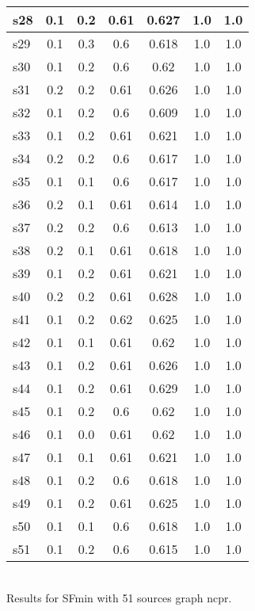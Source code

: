 \documentclass{article}
\begin{document}
\begin{tabular}{|l|c|c|c|c|c|c|}
\hline
s28 &0.1 & 0.2 & 0.61 & 0.627 & 1.0 & 1.0\\
\hline
s29 &0.1 & 0.3 & 0.6 & 0.618 & 1.0 & 1.0\\
\hline
s30 &0.1 & 0.2 & 0.6 & 0.62 & 1.0 & 1.0\\
\hline
s31 &0.2 & 0.2 & 0.61 & 0.626 & 1.0 & 1.0\\
\hline
s32 &0.1 & 0.2 & 0.6 & 0.609 & 1.0 & 1.0\\
\hline
s33 &0.1 & 0.2 & 0.61 & 0.621 & 1.0 & 1.0\\
\hline
s34 &0.2 & 0.2 & 0.6 & 0.617 & 1.0 & 1.0\\
\hline
s35 &0.1 & 0.1 & 0.6 & 0.617 & 1.0 & 1.0\\
\hline
s36 &0.2 & 0.1 & 0.61 & 0.614 & 1.0 & 1.0\\
\hline
s37 &0.2 & 0.2 & 0.6 & 0.613 & 1.0 & 1.0\\
\hline
s38 &0.2 & 0.1 & 0.61 & 0.618 & 1.0 & 1.0\\
\hline
s39 &0.1 & 0.2 & 0.61 & 0.621 & 1.0 & 1.0\\
\hline
s40 &0.2 & 0.2 & 0.61 & 0.628 & 1.0 & 1.0\\
\hline
s41 &0.1 & 0.2 & 0.62 & 0.625 & 1.0 & 1.0\\
\hline
s42 &0.1 & 0.1 & 0.61 & 0.62 & 1.0 & 1.0\\
\hline
s43 &0.1 & 0.2 & 0.61 & 0.626 & 1.0 & 1.0\\
\hline
s44 &0.1 & 0.2 & 0.61 & 0.629 & 1.0 & 1.0\\
\hline
s45 &0.1 & 0.2 & 0.6 & 0.62 & 1.0 & 1.0\\
\hline
s46 &0.1 & 0.0 & 0.61 & 0.62 & 1.0 & 1.0\\
\hline
s47 &0.1 & 0.1 & 0.61 & 0.621 & 1.0 & 1.0\\
\hline
s48 &0.1 & 0.2 & 0.6 & 0.618 & 1.0 & 1.0\\
\hline
s49 &0.1 & 0.2 & 0.61 & 0.625 & 1.0 & 1.0\\
\hline
s50 &0.1 & 0.1 & 0.6 & 0.618 & 1.0 & 1.0\\
\hline
s51 &0.1 & 0.2 & 0.6 & 0.615 & 1.0 & 1.0\\
\hline
\end{tabular}\\

\noindent Results for SFmin with 51 sources graph ncpr.
\end{document}
